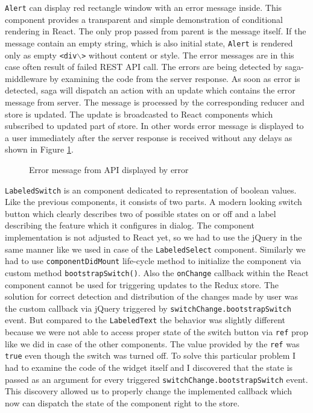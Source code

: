 \texttt{Alert} can display red rectangle window with an error message inside. This component provides a transparent and simple demonstration of conditional rendering in React. The only prop passed from parent is the message itself. If the message contain an empty string, which is also initial state, \texttt{Alert} is rendered only as empty \texttt{<div$\backslash$>} without content or style. 
The error messages are in this case often result of failed REST API call. The errors are being detected by saga-middleware by examining the code from the server response. As soon as error is detected, saga will dispatch an action with an update which contains the error message from server. The message is processed by the corresponding reducer and store is updated. The update is broadcasted to React components which subscribed to updated part of store. In other words error message is displayed to a user immediately after the server response is received without any delays as shown in Figure \ref{alert}.

\begin{figure}[h]
\caption{Error message from API displayed by error}
\label{alert}
\end{figure}

\texttt{LabeledSwitch} is an component dedicated to representation of boolean values. Like the previous components, it consists of two parts. A modern looking switch button which clearly describes two of possible states on or off and a label describing the feature which it configures in dialog. The component implementation is not adjusted to React yet, so we had to use the jQuery in the same manner like  we used in case of the \texttt{LabeledSelect} component. Similarly we had to use \texttt{componentDidMount} life-cycle method to initialize the component via custom method \texttt{bootstrapSwitch()}. Also the \texttt{onChange} callback within the React component cannot be used for triggering updates to the Redux store. The solution for correct detection and distribution of the changes made by user was the custom callback via jQuery triggered by \texttt{switchChange.bootstrapSwitch} event. But compared to the \texttt{LabeledText} the behavior was slightly different because we were not able to access proper state of the switch button via \texttt{ref} prop like we did in case of the other components. The value provided by the \texttt{ref} was \texttt{true} even though the switch was turned off. To solve this particular problem I had to examine the code of the widget itself and I discovered that the state is passed as an argument for every triggered \texttt{switchChange.bootstrapSwitch} event. This discovery allowed us to properly change the implemented callback which now can dispatch the state of the component right to the store.


